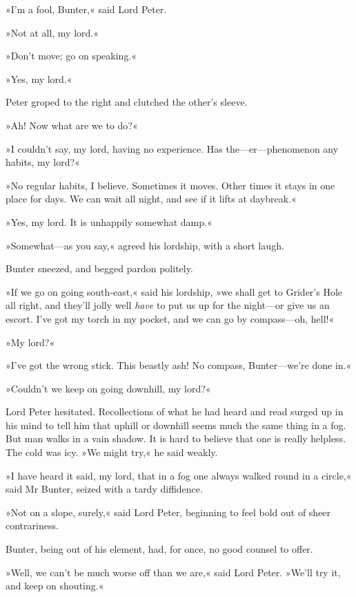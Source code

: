 »I'm a fool, Bunter,« said Lord Peter.

»Not at all, my lord.«

»Don't move; go on speaking.«

»Yes, my lord.«

Peter groped to the right and clutched the other's sleeve.

»Ah! Now what are we to do?«

»I couldn't say, my lord, having no experience. Has the\allowbreak---\allowbreak er---\newline phenomenon any habits, my lord?«

»No regular habits, I believe. Sometimes it moves. Other times it stays in one place for days. We can wait all night, and see if it lifts at daybreak.«

»Yes, my lord. It is unhappily somewhat damp.«

»Somewhat\allowbreak---\allowbreak as you say,« agreed his lordship, with a short laugh.

Bunter sneezed, and begged pardon politely.

»If we go on going south-east,« said his lordship, »we shall get to Grider's Hole all right, and they'll jolly well \textit{have} to put us up for the night\allowbreak---\allowbreak or give us an escort. I've got my torch in my pocket, and we can go by compass\allowbreak---\allowbreak oh, hell!«

»My lord?«

»I've got the wrong stick. This beastly ash! No compass, Bunter\allowbreak---\allowbreak we're done in.«

»Couldn't we keep on going downhill, my lord?«

Lord Peter hesitated. Recollections of what he had heard and read surged up in his mind to tell him that uphill or downhill seems much the same thing in a fog. But man walks in a vain shadow. It is hard to believe that one is really helpless. The cold was icy. »We might try,« he said weakly.

»I have heard it said, my lord, that in a fog one always walked round in a circle,« said Mr Bunter, seized with a tardy diffidence.

»Not on a slope, surely,« said Lord Peter, beginning to feel bold out of sheer contrariness.

Bunter, being out of his element, had, for once, no good counsel to offer.

»Well, we can't be much worse off than we are,« said Lord Peter. »We'll try it, and keep on shouting.«

